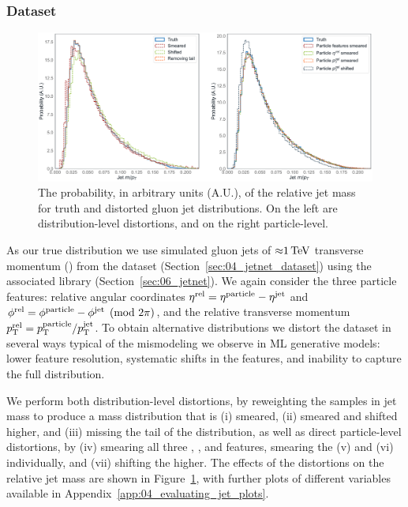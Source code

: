 \subsubsection{Dataset}
\label{sec:04_evaluating_jetdata_dataset}

\begin{figure}[ht]
    \includegraphics[width=\textwidth]{figures/04-ML4Sim/evaluating/jet_mass_dists.pdf}
    \caption{The probability, in arbitrary units (A.U.), of the relative jet mass for truth and distorted gluon jet distributions. 
    On the left are distribution-level distortions, and on the right particle-level.}
    \label{fig:04_evaluating_jetdists} 
\end{figure}

As our true distribution we use simulated gluon jets of ${\approx}1\,\text{Te\hspace{-.08em}V}$ transverse momentum (\pt) from the \jetnet dataset (Section~\ref{sec:04_jetnet_dataset}) using the associated \jetnet library (Section~\ref{sec:06_jetnet}).
We again consider the three particle features: relative angular coordinates 
$\eta^\mathrm{rel} =\eta^\mathrm{particle} - \eta^\mathrm{jet}$ and 
$\phi^\mathrm{rel} =\phi^\mathrm{particle} - \phi^\mathrm{jet} \pmod{2\pi}$, and the relative transverse momentum 
$p_\mathrm{T}^\mathrm{rel} = p_\mathrm{T}^\mathrm{particle}/p_\mathrm{T}^\mathrm{jet}$.
To obtain alternative distributions we distort the dataset in several ways typical of the mismodeling we observe in ML generative models: lower feature resolution, systematic shifts in the features, and inability to capture the full distribution.

We perform both distribution-level distortions, by reweighting the samples in jet mass to produce a mass distribution that is (i) smeared, (ii) smeared and shifted higher, and (iii) missing the tail of the distribution, as well as direct particle-level distortions, by (iv) smearing all three \phirel, \etarel, and \ptrel features, smearing the (v) \ptrel and (vi) \etarel individually, and (vii) shifting the \ptrel higher. 
The effects of the distortions on the relative jet mass are shown in Figure~\ref{fig:04_evaluating_jetdists}, with further plots of different variables available in Appendix~\ref{app:04_evaluating_jet_plots}.


